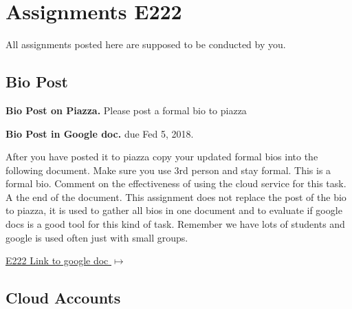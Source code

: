 \section{Assignments E222}
\label{s:e222-assignment}
\label{s:e222-assignments}

All assignments posted here are supposed to be conducted by you. 

\subsection{Bio Post}
\label{E:e222-bio}

\begin{exercise}\label{E:e222-bio-piazza}
{\bf Bio Post on Piazza.} Please post a formal bio to piazza
\end{exercise}


\begin{exercise} \label{E:e222-bio-googledocs}

  {\bf Bio Post in Google doc.} due Fed 5, 2018. 
  
  After you have posted it to piazza
  copy your updated formal bios into the following document.  Make
  sure you use 3rd person and stay formal. This is a formal
  bio. Comment on the effectiveness of using the cloud service for
  this task. A the end of the document. This assignment does not
  replace the post of the bio to piazza, it is used to gather all bios
  in one document and to evaluate if google docs is a good tool for
  this kind of task. Remember we have lots of students and google is
  used often just with small groups.
 
 \smallskip

 {\hfill
   \href{https://docs.google.com/document/d/1pNK94qoRfZkill_JrGAzjd8aQ6Aar0pEXhU_Tgog0W0/edit?usp=sharing}{E222
     Link to google doc $\mapsto$}}


 \end{exercise}


\subsection{Cloud Accounts}
\label{E:e222-iu-google-services}


